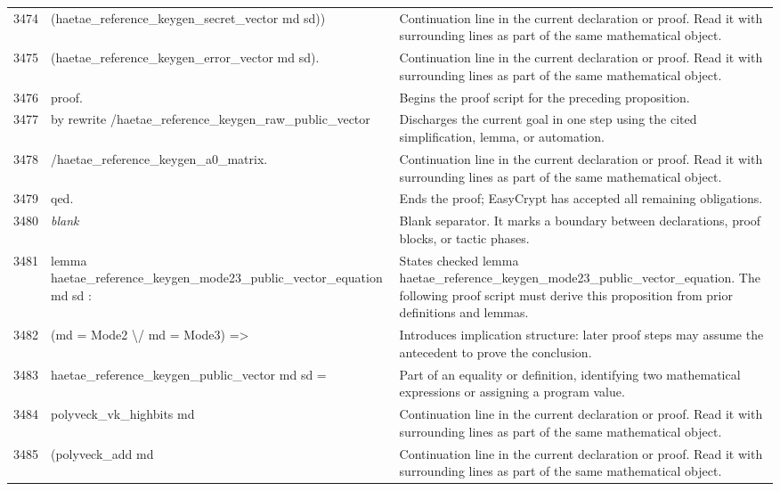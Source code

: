 \documentclass[10pt]{article}
\begin{document}
\begin{longtable}{r L{0.53\textwidth} L{0.37\textwidth}}
3474 & {\ttfamily\scriptsize       (haetae\_reference\_keygen\_secret\_vector md sd))} & Continuation line in the current declaration or proof.  Read it with surrounding lines as part of the same mathematical object. \\
3475 & {\ttfamily\scriptsize     (haetae\_reference\_keygen\_error\_vector md sd).} & Continuation line in the current declaration or proof.  Read it with surrounding lines as part of the same mathematical object. \\
3476 & {\ttfamily\scriptsize proof.} & Begins the proof script for the preceding proposition. \\
3477 & {\ttfamily\scriptsize by rewrite /haetae\_reference\_keygen\_raw\_public\_vector} & Discharges the current goal in one step using the cited simplification, lemma, or automation. \\
3478 & {\ttfamily\scriptsize            /haetae\_reference\_keygen\_a0\_matrix.} & Continuation line in the current declaration or proof.  Read it with surrounding lines as part of the same mathematical object. \\
3479 & {\ttfamily\scriptsize qed.} & Ends the proof; EasyCrypt has accepted all remaining obligations. \\
3480 & {\ttfamily\scriptsize \emph{blank}} & Blank separator.  It marks a boundary between declarations, proof blocks, or tactic phases. \\
3481 & {\ttfamily\scriptsize lemma haetae\_reference\_keygen\_mode23\_public\_vector\_equation md sd :} & States checked lemma haetae\_reference\_keygen\_mode23\_public\_vector\_equation.  The following proof script must derive this proposition from prior definitions and lemmas. \\
3482 & {\ttfamily\scriptsize   (md = Mode2 \textbackslash{}/ md = Mode3) =>} & Introduces implication structure: later proof steps may assume the antecedent to prove the conclusion. \\
3483 & {\ttfamily\scriptsize   haetae\_reference\_keygen\_public\_vector md sd =} & Part of an equality or definition, identifying two mathematical expressions or assigning a program value. \\
3484 & {\ttfamily\scriptsize   polyveck\_vk\_highbits md} & Continuation line in the current declaration or proof.  Read it with surrounding lines as part of the same mathematical object. \\
3485 & {\ttfamily\scriptsize     (polyveck\_add md} & Continuation line in the current declaration or proof.  Read it with surrounding lines as part of the same mathematical object. \\

\end{longtable}
\end{document}
